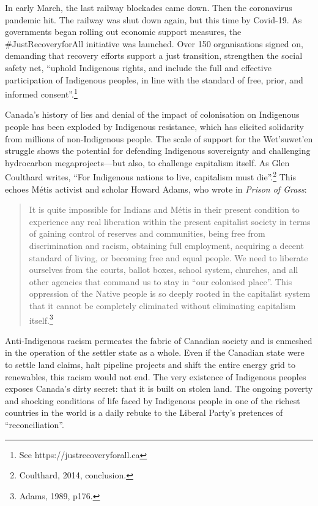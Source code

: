 In early March, the last railway blockades came down. Then the coronavirus pandemic hit. The railway was shut down again, but this time by Covid-19. As governments began rolling out economic support measures, the \#JustRecoveryforAll initiative was launched. Over 150 organisations signed on, demanding that recovery efforts support a just transition, strengthen the social safety net, ``uphold Indigenous rights, and include the full and effective participation of Indigenous peoples, in line with the standard of free, prior, and informed consent''.\footnote{See https://justrecoveryforall.ca}

Canada's history of lies and denial of the impact of colonisation on Indigenous people has been exploded by Indigenous resistance, which has elicited solidarity from millions of non-Indigenous people. The scale of support for the Wet'suwet'en struggle shows the potential for defending Indigenous sovereignty and challenging hydrocarbon megaprojects---but also, to challenge capitalism itself. As Glen Coulthard writes, ``For Indigenous nations to live, capitalism must die''.\footnote{Coulthard, 2014, conclusion.} This echoes M\'{e}tis activist and scholar Howard Adams, who wrote in \emph{Prison of Grass}:

\blockquote{It is quite impossible for Indians and M\'{e}tis in their present condition to experience any real liberation within the present capitalist society in terms of gaining control of reserves and communities, being free from discrimination and racism, obtaining full employment, acquiring a decent standard of living, or becoming free and equal people. We need to liberate ourselves from the courts, ballot boxes, school system, churches, and all other agencies that command us to stay in ``our colonised place''. This oppression of the Native people is so deeply rooted in the capitalist system that it cannot be completely eliminated without eliminating capitalism itself.\footnote{Adams, 1989, p176.}}

Anti-Indigenous racism permeates the fabric of Canadian society and is enmeshed in the operation of the settler state as a whole. Even if the Canadian state were to settle land claims, halt pipeline projects and shift the entire energy grid to renewables, this racism would not end. The very existence of Indigenous peoples exposes Canada's dirty secret: that it is built on stolen land. The ongoing poverty and shocking conditions of life faced by Indigenous people in one of the richest countries in the world is a daily rebuke to the Liberal Party's pretences of ``reconciliation''.

